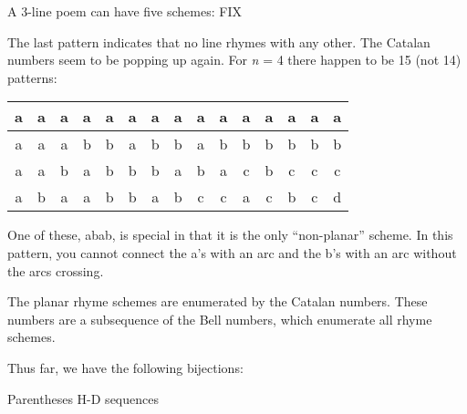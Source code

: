 \documentclass[10pt,letter]{article}
\begin{document}
A 3-line poem can have five schemes:
FIX

The last pattern indicates that no line rhymes with any other. The
Catalan numbers seem to be popping up again. For \emph{n} = 4 there
happen to be 15 (not 14) patterns:
\begin{longtable}[]{@{}ccccccccccccccc@{}}
\toprule
a & a & a & a & a & a & a & a & a & a & a & a & a & a & a\tabularnewline
\midrule
\endhead
a & a & a & b & b & a & b & b & a & b & b & b & b & b & b\tabularnewline
a & a & b & a & b & b & b & a & b & a & c & b & c & c & c\tabularnewline
a & b & a & a & b & b & a & b & c & c & a & c & b & c & d\tabularnewline
\bottomrule

\end{longtable}

One of these, abab, is special in that it is the only ``non-planar''
scheme. In this pattern, you cannot connect the a's with an arc and the
b's with an arc without the arcs crossing.

The planar rhyme schemes are enumerated by the Catalan numbers. These
numbers are a subsequence of the Bell numbers, which enumerate all rhyme
schemes.

Thus far, we have the following bijections:

Parentheses   H-D sequences
\end{document}
